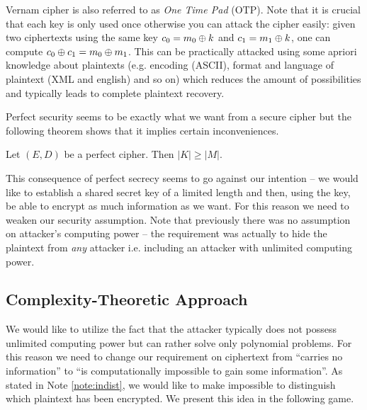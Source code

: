 \begin{note}
	Vernam cipher is also referred to as {\em One Time Pad} (OTP). Note that it is crucial that each key is only used once otherwise you can attack the cipher easily: given two ciphertexts using the same key $c_0=m_0\oplus k$ and $c_1=m_1\oplus k$, one can compute $c_0\oplus c_1 = m_0\oplus m_1$. This can be practically attacked using some apriori knowledge about plaintexts (e.g. encoding (ASCII), format and language of plaintext (XML and english) and so on) which reduces the amount of possibilities and typically leads to complete plaintext recovery.
\end{note}

Perfect security seems to be exactly what we want from a secure cipher but the following theorem shows that it implies certain inconveniences.

\begin{thm}
\label{thm:kgeqm}
	Let $(E,D)$ be a perfect cipher. Then $|K| \geq |M|$.
\end{thm}

\begin{note}
\label{note:intent}
	This consequence of perfect secrecy seems to go against our intention -- we would like to establish a shared secret key of a limited length and then, using the key, be able to encrypt as much information as we want. For this reason we need to weaken our security assumption. Note that previously there was no assumption on attacker's computing power -- the requirement was actually to hide the  plaintext from {\em any} attacker i.e. including an attacker with unlimited computing power.
\end{note}


\subsection{Complexity-Theoretic Approach}

We would like to utilize the fact that the attacker typically does not possess unlimited computing power but can rather solve only polynomial problems. For this reason we need to change our requirement on ciphertext from ``carries no information'' to ``is computationally impossible to gain some information''. As stated in Note \ref{note:indist}, we would like to make impossible to distinguish which plaintext has been encrypted. We present this idea in the following game.

